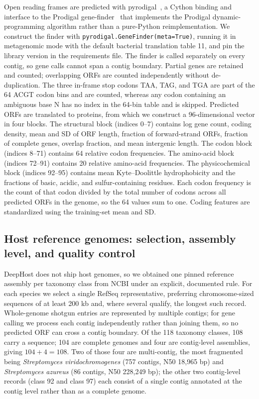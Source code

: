 \documentclass[utf8]{FrontiersinVancouver}
\begin{document}
Open reading frames are predicted with pyrodigal~\citep{larralde2022pyrodigal}, a Cython binding and interface to the Prodigal gene-finder~\citep{hyatt2010prodigal} that implements the Prodigal dynamic-programming algorithm rather than a pure-Python reimplementation. We construct the finder with \texttt{pyrodigal.GeneFinder(meta=True)}, running it in metagenomic mode with the default bacterial translation table 11, and pin the library version in the requirements file. The finder is called separately on every contig, so gene calls cannot span a contig boundary. Partial genes are retained and counted; overlapping ORFs are counted independently without de-duplication. The three in-frame stop codons TAA, TAG, and TGA are part of the 64 ACGT codon bins and are counted, whereas any codon containing an ambiguous base N has no index in the 64-bin table and is skipped. Predicted ORFs are translated to proteins, from which we construct a 96-dimensional vector in four blocks. The structural block (indices 0--7) contains log gene count, coding density, mean and SD of ORF length, fraction of forward-strand ORFs, fraction of complete genes, overlap fraction, and mean intergenic length. The codon block (indices 8--71) contains 64 relative codon frequencies. The amino-acid block (indices 72--91) contains 20 relative amino-acid frequencies. The physicochemical block (indices 92--95) contains mean Kyte--Doolittle hydrophobicity and the fractions of basic, acidic, and sulfur-containing residues. Each codon frequency is the count of that codon divided by the total number of codons across all predicted ORFs in the genome, so the 64 values sum to one. Coding features are standardized using the training-set mean and SD.

\subsection{Host reference genomes: selection, assembly level, and quality control}

DeepHost does not ship host genomes, so we obtained one pinned reference assembly per taxonomy class from NCBI under an explicit, documented rule. For each species we select a single RefSeq representative, preferring chromosome-sized sequences of at least 200 kb and, where several qualify, the longest such record. Whole-genome shotgun entries are represented by multiple contigs; for gene calling we process each contig independently rather than joining them, so no predicted ORF can cross a contig boundary. Of the 118 taxonomy classes, 108 carry a sequence; 104 are complete genomes and four are contig-level assemblies, giving $104+4=108$. Two of those four are multi-contig, the most fragmented being \textit{Streptomyces viridochromogenes} (757 contigs, N50 18,965 bp) and \textit{Streptomyces azureus} (86 contigs, N50 228,249 bp); the other two contig-level records (class 92 and class 97) each consist of a single contig annotated at the contig level rather than as a complete genome.
\end{document}
